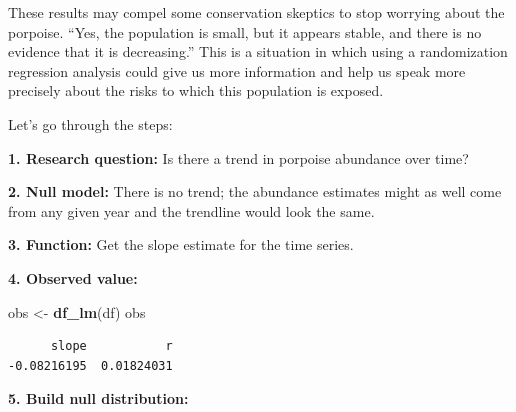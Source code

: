 \documentclass[
]{book}
\newenvironment{Shaded}{\begin{snugshade}}{\end{snugshade}}
\newcommand{\ControlFlowTok}[1]{\textcolor[rgb]{0.13,0.29,0.53}{\textbf{#1}}}
\newcommand{\DecValTok}[1]{\textcolor[rgb]{0.00,0.00,0.81}{#1}}
\newcommand{\KeywordTok}[1]{\textcolor[rgb]{0.13,0.29,0.53}{\textbf{#1}}}
\newcommand{\NormalTok}[1]{#1}
\newcommand{\OperatorTok}[1]{\textcolor[rgb]{0.81,0.36,0.00}{\textbf{#1}}}
\newcommand{\StringTok}[1]{\textcolor[rgb]{0.31,0.60,0.02}{#1}}
\begin{document}
These results may compel some conservation skeptics to stop worrying about the porpoise. ``Yes, the population is small, but it appears stable, and there is no evidence that it is decreasing.'' This is a situation in which using a randomization regression analysis could give us more information and help us speak more precisely about the risks to which this population is exposed.

Let's go through the steps:

\textbf{1. Research question:} Is there a trend in porpoise abundance over time?

\textbf{2. Null model:} There is no trend; the abundance estimates might as well come from any given year and the trendline would look the same.

\textbf{3. Function:} Get the slope estimate for the time series.

\begin{Shaded}
\end{Shaded}

\textbf{4. Observed value:}

\begin{Shaded}
\begin{Highlighting}[]
\NormalTok{obs <-}\StringTok{ }\KeywordTok{df_lm}\NormalTok{(df)}
\NormalTok{obs }
\end{Highlighting}
\end{Shaded}

\begin{verbatim}
      slope           r 
-0.08216195  0.01824031 
\end{verbatim}

\textbf{5. Build null distribution:}
\end{document}
